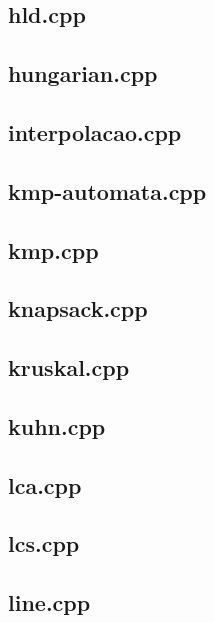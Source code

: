 \documentclass[a4paper,12pt]{article}
\begin{document}
\subsection{hld.cpp}


\subsection{hungarian.cpp}


\subsection{interpolacao.cpp}


\subsection{kmp-automata.cpp}


\subsection{kmp.cpp}


\subsection{knapsack.cpp}


\subsection{kruskal.cpp}


\subsection{kuhn.cpp}


\subsection{lca.cpp}


\subsection{lcs.cpp}


\subsection{line.cpp}

\end{document}
